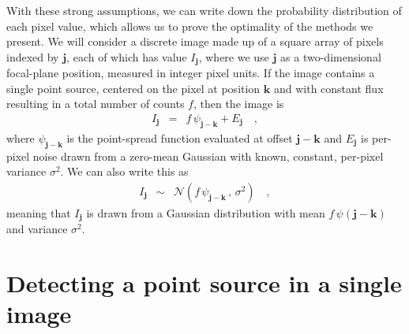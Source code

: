\documentclass[11pt,letterpaper,linenumbers]{aastex63}
\newcommand{\equationname}{equation}
\newcommand{\eqnref}[1]{\mbox{\equationname~\ref{#1}}}
\newcommand{\drawnfrom}{\sim}
\newcommand{\gaussianN}{\mathcal{N}}
\newcommand{\gaussx}[2]{\gaussianN\!\left(#1 \, , \, #2\right)}
\newcommand{\psf}{\psi}
\newcommand{\psfat}[1]{\psf_{#1}}
\newcommand{\noise}{E}
\renewcommand{\vec}[1]{\boldsymbol{#1}}
\newcommand{\ivec}{\vec{i}}
\newcommand{\jvec}{\vec{j}}
\newcommand{\kvec}{\vec{k}}
\newcommand{\iina}{\ivec \,\, \mathrm{in} \,\, \mathcal{A}}
\begin{document}
With these strong assumptions, we can write down the probability
distribution of each pixel value, which allows us to prove the
optimality of the methods we present.
%
We will consider a discrete image made up of a square array of pixels
indexed by $\jvec$, each of which has value $I_{\jvec}$, where we
use $\jvec$ as a two-dimensional focal-plane position, measured in
integer pixel units.
%
If the image contains a single point source, centered on
the pixel at position $\kvec$ and with constant flux resulting in a
total number of counts $f$, then the image is
\begin{eqnarray}
  I_{\jvec} &=& f \, \psfat{\jvec - \kvec} + \noise_{\jvec} \quad ,
  \label{eqn:image}
\end{eqnarray}
where $\psfat{\jvec-\kvec}$ is the point-spread function evaluated at
offset $\jvec-\kvec$ and $\noise_{\jvec}$ is per-pixel noise drawn
from a zero-mean Gaussian with known, constant, per-pixel variance $\sigma^2$.
%
We can also write this as
\begin{eqnarray}
  I_{\jvec} &\drawnfrom& \gaussx{f \, \psfat{\jvec - \kvec}}{\sigma^2}
  \nonumber
  \quad ,
\end{eqnarray}
meaning that $I_{\jvec}$ is drawn from a Gaussian distribution with
mean $f\, \psf(\jvec - \kvec)$ and variance $\sigma^2$.


\section{Detecting a point source in a single image}
\label{sec:detection}



\end{document}
